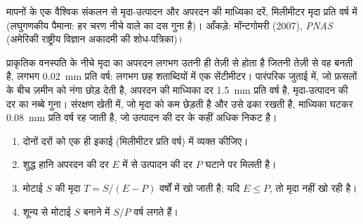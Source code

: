 \begin{omfigure}

{\small मापनों के एक वैश्विक संकलन से मृदा-उत्पादन और अपरदन की
माध्यिका दरें, मिलीमीटर मृदा प्रति वर्ष में (लघुगणकीय
पैमाना: हर चरण नीचे वाले का दस गुना है)। आँकड़े: मॉन्टगोमरी (2007),
\emph{PNAS} (अमेरिकी राष्ट्रीय विज्ञान अकादमी की शोध-पत्रिका)।}
\end{omfigure}

प्राकृतिक वनस्पति के नीचे मृदा का अपरदन लगभग उतनी ही तेज़ी से होता है जितनी तेज़ी से वह बनती है,
लगभग \qty{0.02}{mm} प्रति वर्ष: लगभग छह शताब्दियों में एक सेंटीमीटर। पारंपरिक
जुताई में, जो फ़सलों के बीच ज़मीन को नंगा छोड़ देती है, अपरदन की माध्यिका दर
\qty{1.5}{mm} प्रति वर्ष है, मृदा-उत्पादन की दर का नब्बे गुना।
संरक्षण खेती में, जो मृदा को कम छेड़ती है और उसे ढका रखती है,
माध्यिका घटकर \qty{0.08}{mm} प्रति वर्ष रह जाती है, जो उत्पादन की दर के कहीं
अधिक निकट है।

\begin{method}\label{met:g10:soil-formation:rates}
\begin{enumerate}
  \item दोनों दरों को एक ही इकाई (मिलीमीटर प्रति वर्ष) में व्यक्त कीजिए।
  \item शुद्ध हानि अपरदन की दर $E$ में से उत्पादन की दर $P$ घटाने पर मिलती है।
  \item मोटाई $S$ की मृदा $T = S/(E - P)$ वर्षों में खो जाती है; यदि
        $E \le P$, तो मृदा नहीं खो रही है।
  \item शून्य से मोटाई $S$ बनाने में $S/P$ वर्ष लगते हैं।
\end{enumerate}
\end{method}

